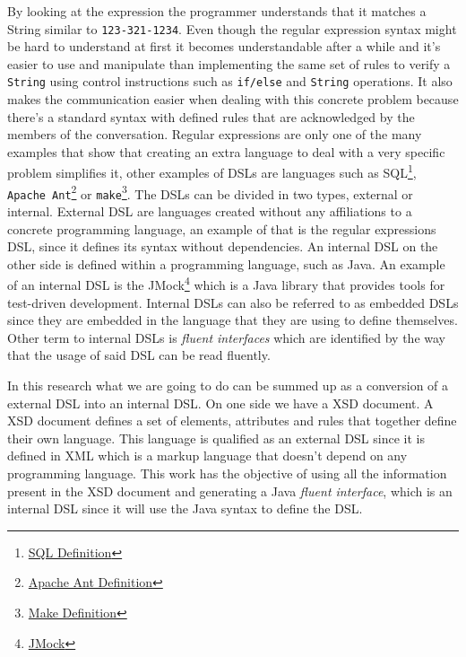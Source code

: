 \noindent
By looking at the expression the programmer understands that it matches a String similar to \texttt{123-321-1234}. Even though the regular expression syntax might be hard to understand at first it becomes understandable after a while and it's easier to use and manipulate than implementing the same set of rules to verify a \texttt{String} using control instructions such as \texttt{if/else} and \texttt{String} operations. It also makes the communication easier when dealing with this concrete problem because there's a standard syntax with defined rules that are acknowledged by the members of the conversation. Regular expressions are only one of the many examples that show that creating an extra language to deal with a very specific problem simplifies it, other examples of \ac{DSL}s are languages such as \ac{SQL}\footnote{\href{https://www.techopedia.com/definition/1245/structured-query-language-sql}{SQL Definition}}, \texttt{Apache Ant}\footnote{\href{https://www.techopedia.com/definition/16219/apache-ant}{Apache Ant Definition}} or \texttt{make}\footnote{\href{https://www.techopedia.com/definition/16406/make}{Make Definition}}. The \ac{DSL}s can be divided in two types, external or internal. External \ac{DSL} are languages created without any affiliations to a concrete programming language, an example of that is the regular expressions \ac{DSL}, since it defines its syntax without dependencies. An internal \ac{DSL} on the other side is defined within a programming language, such as Java. An example of an internal \ac{DSL} is the JMock\footnote{\href{http://jmock.org/}{JMock}} which is a Java library that provides tools for test-driven development. Internal \ac{DSL}s can also be referred to as embedded \ac{DSL}s since they are embedded in the language that they are using to define themselves. Other term to internal \ac{DSL}s is \textit{fluent interfaces} which are identified by the way that the usage of said \ac{DSL} can be read fluently.

\noindent
In this research what we are going to do can be summed up as a conversion of a external \ac{DSL} into an internal \ac{DSL}. On one side we have a \ac{XSD} document. A \ac{XSD} document defines a set of elements, attributes and rules that together define their own language. This language is qualified as an external \ac{DSL} since it is defined in \ac{XML} which is a markup language that doesn't depend on any programming language. This work has the objective of using all the information present in the \ac{XSD} document and generating a Java \textit{fluent interface}, which is an internal \ac{DSL} since it will use the Java syntax to define the \ac{DSL}. 

